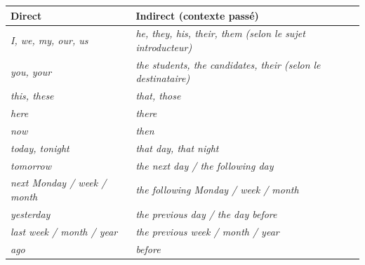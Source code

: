 \documentclass[11pt]{article}
\newcommand{\eng}[1]{\ifmmode\text{\textit{#1}}\else\begingroup\selectlanguage{english}\itshape #1\endgroup\fi}
\begin{document}
\begin{propriete}
\begin{center}
\begin{tabularx}{\linewidth}{|X|X|}
\hline
\rowcolor{popblueL} \textbf{Direct} & \textbf{Indirect (contexte passé)} \\
\hline
\eng{I, we, my, our, us} & \eng{he, they, his, their, them} (selon le sujet introducteur) \\
\hline
\eng{you, your} & \eng{the students, the candidates, their} (selon le destinataire) \\
\hline
\eng{this, these} & \eng{that, those} \\
\hline
\eng{here} & \eng{there} \\
\hline
\eng{now} & \eng{then} \\
\hline
\eng{today, tonight} & \eng{that day, that night} \\
\hline
\eng{tomorrow} & \eng{the next day / the following day} \\
\hline
\eng{next Monday / week / month} & \eng{the following Monday / week / month} \\
\hline
\eng{yesterday} & \eng{the previous day / the day before} \\
\hline
\eng{last week / month / year} & \eng{the previous week / month / year} \\
\hline
\eng{ago} & \eng{before} \\
\hline
\end{tabularx}
\end{center}
\end{propriete}
\end{document}
